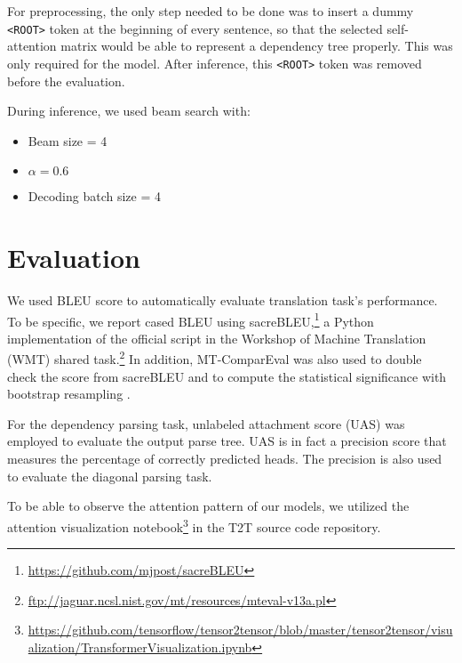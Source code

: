 For preprocessing, the only step needed to be done was to insert a dummy \texttt{<ROOT>} token at the beginning of every sentence, so that the selected self-attention matrix would be able to represent a dependency tree properly.
This was only required for the \DepParse model.
After inference, this \texttt{<ROOT>} token was removed before the evaluation.

During inference, we used beam search with:
\begin{itemize}
    \item Beam size = 4
    \item $\alpha = 0.6$
    \item Decoding batch size = 4
\end{itemize}

\section{Evaluation}
\label{dataexp-eval}

We used BLEU score to automatically evaluate translation task's performance.
To be specific, we report cased BLEU using sacreBLEU,\footnote{\url{https://github.com/mjpost/sacreBLEU}} a Python implementation of the official script in the Workshop of Machine Translation (WMT) shared task.\footnote{\url{ftp://jaguar.ncsl.nist.gov/mt/resources/mteval-v13a.pl}}
In addition, MT-ComparEval \citep{klejch2015mt} was also used to double check the score from sacreBLEU and to compute the statistical significance with bootstrap resampling \citep{koehn2004statistical}.

For the dependency parsing task, unlabeled attachment score (UAS) was employed to evaluate the output parse tree.
UAS is in fact a precision score that measures the percentage of correctly predicted heads.
The precision is also used to evaluate the diagonal parsing task.

To be able to observe the attention pattern of our models, we utilized the attention visualization notebook\footnote{\url{https://github.com/tensorflow/tensor2tensor/blob/master/tensor2tensor/visualization/TransformerVisualization.ipynb}} in the T2T source code repository.
